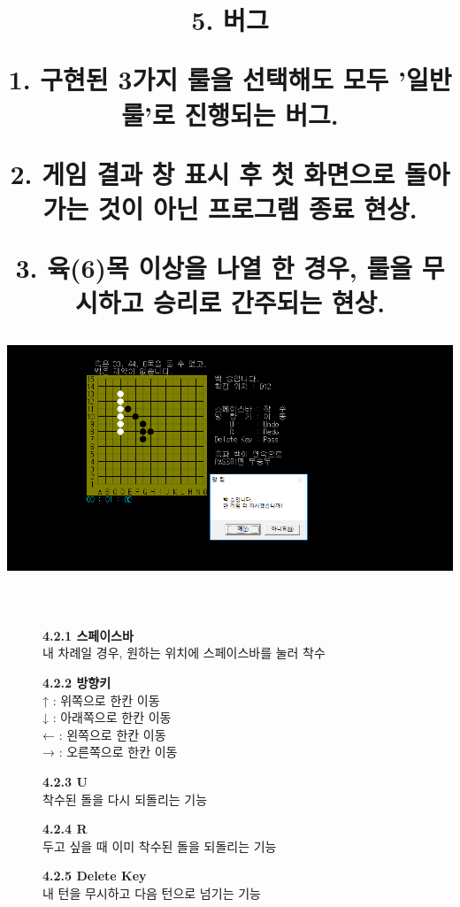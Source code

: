 \documentclass[a4paper, 11pt]{article}
\begin{document}
{\begin{figure}[h]
		
	\begin{center}
		
	
		\textbf{\large4.2.1 스페이스바 \\}
		내 차례일 경우, 원하는 위치에 스페이스바를 눌러 착수\\
		\vspace{0.5cm}
		
		\textbf{\large4.2.2 방향키 \\}
		\qquad↑ : 위쪽으로 한칸 이동 \\
		\qquad↓ : 아래쪽으로 한칸 이동 \\
		\qquad← : 왼쪽으로 한칸 이동 \\
		\qquad→ : 오른쪽으로 한칸 이동 \\
		\vspace{0.5cm}
		
		\textbf{\large4.2.3 U \\}
		 착수된 돌을 다시 되돌리는 기능\\
		\vspace{0.5cm}
		
		\textbf{\large4.2.4 R \\}
		 두고 싶을 때 이미 착수된 돌을 되돌리는 기능\\ 
		\vspace{0.5cm}
		
		\textbf{\large4.2.5 Delete Key \\}
		\qquad 내 턴을 무시하고 다음 턴으로 넘기는 기능 \\
	\end{center}
	\end{figure}

 \newpage
\title{\textbf{\Huge5. 버그 }
	
		\vspace{1cm}
	{\large
\textbf{1. 구현된 3가지 룰을 선택해도 모두 '일반 룰'로 진행되는 버그.}
	
\textbf{2. 게임 결과 창  표시 후 첫 화면으로 돌아가는 것이 아닌 프로그램 종료 현상.}
	
\textbf{3. 육(6)목 이상을 나열 한 경우, 룰을 무시하고 승리로 간주되는 현상. }
\vspace{0.4cm}

\includegraphics[width=1.0\linewidth]{5th.png}
	
}}}
\end{document}
